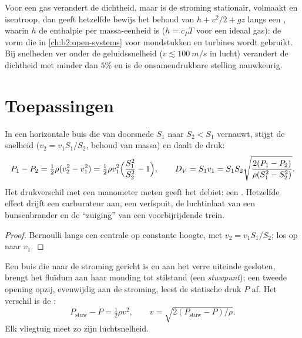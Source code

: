 \begin{remark}\label{rem:b2:euler-bernoulli:compressible}
Voor een gas verandert de dichtheid, maar is de stroming stationair,
volmaakt en isentroop, dan geeft hetzelfde bewijs het behoud van
$h + v^2/2 + gz$ langs een , waarin $h$ de enthalpie per
massa-eenheid is ($h = c_PT$ voor een ideaal gas): de vorm die in
\cref{ch:b2:open-systems} voor mondstukken en turbines wordt gebruikt. Bij
snelheden ver onder de geluidssnelheid ($v \lesssim \qty{100}{m/s}$ in
lucht) verandert de dichtheid met minder dan $5\%$ en is de onsamendrukbare
stelling nauwkeurig.
\end{remark}

\section{Toepassingen}

\begin{proposition}[De venturimeter]\label{prop:b2:euler-bernoulli:venturi}
In een horizontale buis die van doorsnede $S_1$ naar $S_2 < S_1$ vernauwt,
stijgt de snelheid ($v_2 = v_1S_1/S_2$, behoud van massa) en daalt de druk:
\[
P_1 - P_2 = \tfrac12\rho(v_2^2 - v_1^2) = \tfrac12\rho v_1^2\Bigl(\frac{S_1^2}{S_2^2} - 1\Bigr) ,
\qquad
D_V = S_1v_1 = S_1S_2\sqrt{\frac{2(P_1 - P_2)}{\rho(S_1^2 - S_2^2)}} .
\]
Het drukverschil met een manometer meten geeft het debiet: een
\emph{}. Hetzelfde effect drijft een carburateur aan, een
verfspuit, de luchtinlaat van een bunsenbrander en de ``zuiging'' van een
voorbijrijdende trein.
\end{proposition}

\begin{proof}
Bernoulli langs een centrale  op constante hoogte, met
$v_2 =
v_1S_1/S_2$; los op naar $v_1$.
\end{proof}

\begin{proposition}[De pitotbuis]\label{prop:b2:euler-bernoulli:pitot}
Een buis die naar de stroming gericht is en aan het verre uiteinde gesloten,
brengt het fluïdum aan haar monding tot stilstand (een \emph{stuwpunt}); een
tweede opening opzij, evenwijdig aan de stroming, leest de statische druk
$P$ af. Het verschil is de :
\[
P_{\text{stuw}} - P = \tfrac12\rho v^2 , \qquad v = \sqrt{2(P_{\text{stuw}} - P)/\rho} .
\]
Elk vliegtuig meet zo zijn luchtsnelheid.
\end{proposition}

